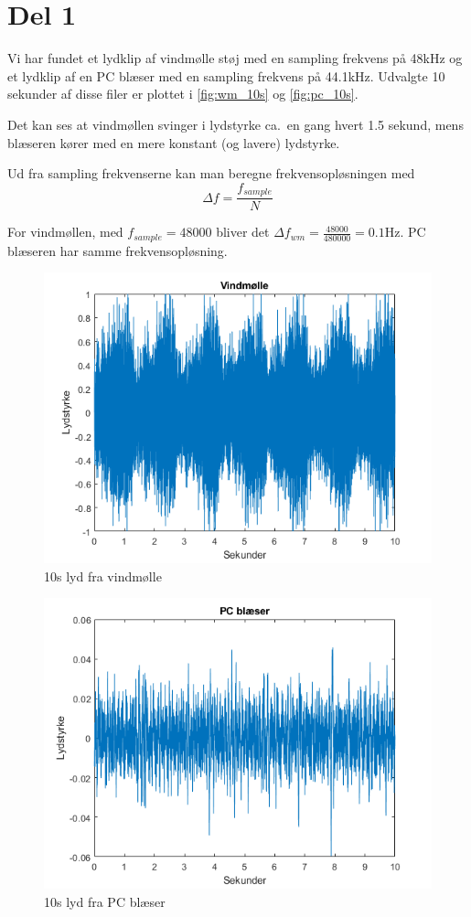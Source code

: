 \section{Del 1}

Vi har fundet et lydklip af vindmølle støj med en sampling frekvens på 48kHz og et lydklip af en PC blæser med en sampling frekvens på 44.1kHz. Udvalgte 10 sekunder af disse filer er plottet i \autoref{fig:wm_10s} og \autoref{fig:pc_10s}.

Det kan ses at vindmøllen svinger i lydstyrke ca.\ en gang hvert 1.5 sekund, mens blæseren kører med en mere konstant (og lavere) lydstyrke.

Ud fra sampling frekvenserne kan man beregne frekvensopløsningen med 
\begin{equation}
\Delta f = \frac{f_{sample}}{N}
\end{equation}

For vindmøllen, med $f_{sample}=48000$ bliver det $\Delta f_{wm} = \frac{48000}{480000} = 0.1$Hz.
PC blæseren har samme frekvensopløsning.


\begin{figure}[h]
\centering
\includegraphics[width=\textwidth]{figures/Windmill_10s}
\caption{10s lyd fra vindmølle}%
\label{fig:wm_10s}
\end{figure}

\newpage

\begin{figure}[h]
\centering
\includegraphics[width=\textwidth]{figures/pcFan_10s}
\caption{10s lyd fra PC blæser}%
\label{fig:pc_10s}
\end{figure}

\newpage
